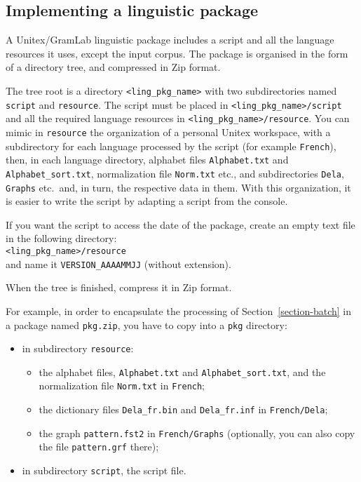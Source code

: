 \subsection{Implementing a linguistic package}
\label{section-packaga-creation}

A Unitex/GramLab linguistic package includes a script and all the language resources it uses,
except the input corpus. The package is organised in the form of a directory tree, and 
compressed in Zip format.

\bigskip
\noindent The tree root is a directory \verb$<ling_pkg_name>$ with two subdirectories
named \verb$script$ and \verb$resource$. The script must be placed in
 \verb$<ling_pkg_name>/script$ and all the required language resources in
\verb$<ling_pkg_name>/resource$. You can mimic in \verb$resource$ the organization of a
personal Unitex workspace, with a subdirectory for each language processed by the script
(for example \verb$French$), then, in each language directory, alphabet files
\verb$Alphabet.txt$ and \verb$Alphabet_sort.txt$, normalization file \verb$Norm.txt$ etc., and
subdirectories \verb$Dela$, \verb$Graphs$ etc.\ and, in turn, the respective data in them.
With this organization, it is easier to write the script by adapting a script from the console.

\bigskip
\noindent If you want the script to access the date of the package, create an empty text file in
the following directory:\\

\verb$<ling_pkg_name>/resource$\\

\noindent and name it \verb$VERSION_AAAAMMJJ$
(without extension).

\bigskip
\noindent When the tree is finished, compress it in Zip format.

\bigskip
\noindent For example, in order to encapsulate the processing of Section~\ref{section-batch}
in a package named \verb$pkg.zip$, you have to copy into a \verb$pkg$ directory:
\begin{itemize}
\item in subdirectory \verb$resource$:
\begin{itemize}
\item the alphabet files, \verb$Alphabet.txt$ and \verb$Alphabet_sort.txt$, and the normalization
file \verb$Norm.txt$ in \verb$French$;
\item the dictionary files \verb$Dela_fr.bin$ and \verb$Dela_fr.inf$ in \verb$French/Dela$;
\item the graph \verb$pattern.fst2$ in \verb$French/Graphs$ (optionally, you can also copy the file
\verb$pattern.grf$ there);
\end{itemize}
\item in subdirectory \verb$script$, the script file.
\end{itemize}



